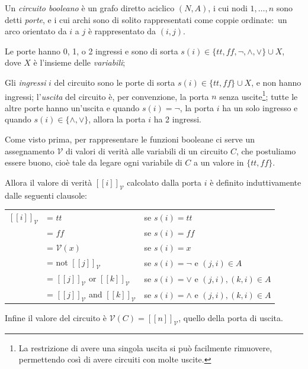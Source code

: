 \begin{definition} 
    Un \textit{circuito booleano} è un grafo diretto aciclico $(N,A)$, i cui nodi $1,\dots,n$ sono detti \textit{porte}, e i cui archi sono di solito rappresentati come coppie ordinate:\ un arco orientato da $i$ a $j$ è rappresentato da $(i, j)$.\

    Le porte hanno 0, 1, o 2 ingressi e sono di sorta $s(i) \in \{\mathit{tt},\mathit{ff},\neg, \land, \lor\} \cup X$, dove $X$ è l'insieme delle \textit{variabili};

    Gli \textit{ingressi} $i$ del circuito sono le porte di sorta $s(i) \in \{\mathit{tt},\mathit{ff}\} \cup X$, e non hanno ingressi; l'\textit{uscita} del circuito è, per convenzione, la porta $n$ senza uscite\footnote{La restrizione di avere una singola uscita si può facilmente rimuovere, permettendo così di avere circuiti con molte uscite.}; tutte le altre porte hanno un'uscita e quando $s(i) = \neg$, la porta $i$ ha un solo ingresso e quando $s(i) \in \{\land, \lor\}$, allora la porta $i$ ha 2 ingressi.

    Come visto prima, per rappresentare le funzioni booleane ci serve un assegnamento $\mathcal{V}$ di valori di verità alle variabili di un circuito $C$, che postuliamo essere buono, cioè tale da legare ogni variabile di $C$ a un valore in $\{\mathit{tt}, \mathit{ff}\}$.\

    Allora il valore di verità $[\![i]\!]_{\mathcal{V}}$ calcolato dalla porta $i$ è definito induttivamente dalle seguenti clausole:
    \begin{table}[H]
        \centering
        \begin{tabular}{l l l}
            $[\![i]\!]_\mathcal{V}$ & = $\mathit{tt}$                                       & se $s(i) =\mathit{tt}$                 \\
                                    & = $\mathit{ff}$                                       & se $s(i) =\mathit{ff}$                 \\
                                    & = $\mathcal{V}(x)$                                    & se $s(i) =x$                           \\
                                    & = not $[\![j]\!]_\mathcal{V}$                         & se $s(i) = \neg$ e $(j,i)\in A$        \\
                                    & = $[\![j]\!]_\mathcal{V}$ or $[\![k]\!]_\mathcal{V}$  & se $s(i) = \lor$ e $(j,i),(k,i)\in A$  \\
                                    & = $[\![j]\!]_\mathcal{V}$ and $[\![k]\!]_\mathcal{V}$ & se $s(i) = \land$ e $(j,i),(k,i)\in A$ \\
        \end{tabular}
    \end{table}
    \noindent Infine il valore del circuito è $\mathcal{V}(C) = [\![n]\!]_\mathcal{V}$, quello della porta di uscita.\
\end{definition}

